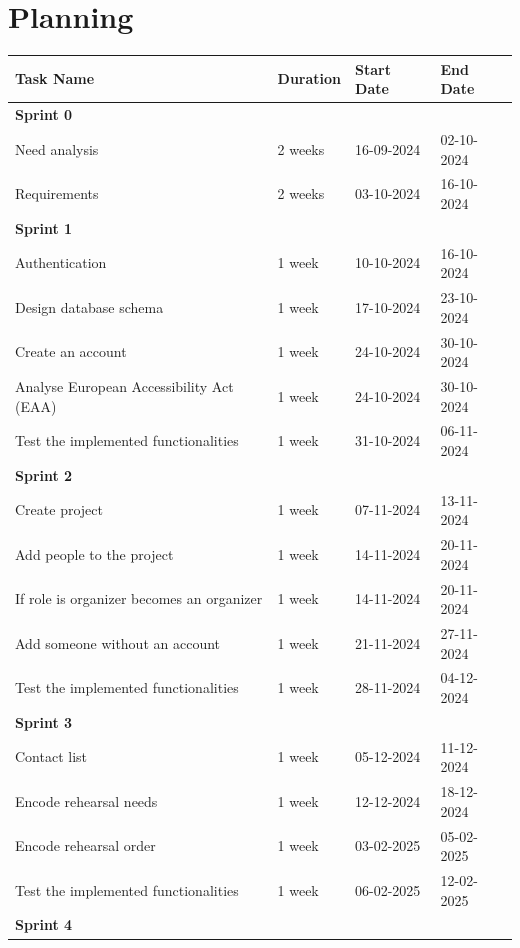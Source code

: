 \documentclass[11pt]{article}
\begin{document}
\section{Planning}
\begin{table}[htbp]
    \centering
    \begin{tabular}{| p{9cm} | p{2cm} | p{2.1cm} | p{2cm} |}
    \hline
    \textbf{Task Name} & \textbf{Duration} & \textbf{Start Date} & \textbf{End Date} \\
    \hline
    \textbf{Sprint 0} &&&\\
    \quad Need analysis & 2 weeks & 16-09-2024 & 02-10-2024 \\
    \quad Requirements & 2 weeks & 03-10-2024 & 16-10-2024 \\
    \textbf{Sprint 1} &&&\\
    \quad Authentication & 1 week & 10-10-2024 & 16-10-2024 \\
    \quad Design database schema & 1 week & 17-10-2024 & 23-10-2024 \\
    \quad Create an account & 1 week & 24-10-2024 & 30-10-2024 \\
    \quad Analyse European Accessibility Act (EAA) & 1 week & 24-10-2024 & 30-10-2024 \\
    \quad Test the implemented functionalities & 1 week & 31-10-2024 & 06-11-2024\\
    \textbf{Sprint 2} &&&\\
    \quad Create project & 1 week & 07-11-2024 & 13-11-2024 \\
    \quad Add people to the project & 1 week & 14-11-2024 & 20-11-2024 \\
    \quad If role is organizer becomes an organizer & 1 week & 14-11-2024 & 20-11-2024 \\
    \quad Add someone without an account & 1 week & 21-11-2024 & 27-11-2024 \\
    \quad Test the implemented functionalities & 1 week & 28-11-2024 & 04-12-2024\\
    \textbf{Sprint 3} &&&\\
    \quad Contact list & 1 week & 05-12-2024 & 11-12-2024 \\
    \quad Encode rehearsal needs & 1 week & 12-12-2024 & 18-12-2024 \\
    \quad Encode rehearsal order & 1 week & 03-02-2025 & 05-02-2025 \\
    \quad Test the implemented functionalities & 1 week & 06-02-2025 & 12-02-2025\\
    \textbf{Sprint 4} &&&\\

\end{tabular}
\end{table}
\end{document}
